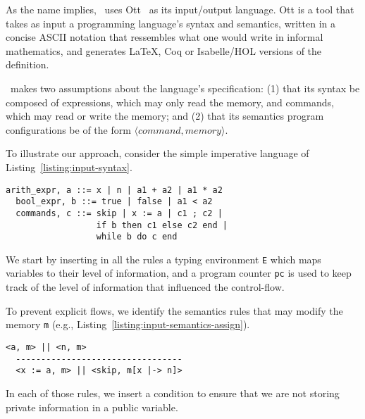 \documentclass[sigplan,10pt]{acmart}\settopmatter{printfolios=true,printccs=false,printacmref=false}
\begin{document}
As the name implies, \ottifc\ uses Ott~\cite{DBLP:journals/jfp/SewellNOPRSS10} as its input/output language. Ott is a tool that takes as input a programming language's syntax and semantics, written in a concise ASCII notation that ressembles what one would write in informal mathematics, and generates LaTeX, Coq or Isabelle/HOL versions of the definition.

\ottifc\ makes two assumptions about the language's specification: (1) that its syntax be composed of expressions, which may only read the memory, and commands, which may read or write the memory; and (2) that its semantics program configurations be of the form $\langle command, memory\rangle$. 

To illustrate our approach, consider the simple imperative language of Listing~\ref{listing:input-syntax}.
\begin{lstlisting}[label=listing:input-syntax,captionpos=b,caption=Ott syntax of a simple imperative language]
  arith_expr, a ::= x | n | a1 + a2 | a1 * a2 
  bool_expr, b ::= true | false | a1 < a2
  commands, c ::= skip | x := a | c1 ; c2 | 
                  if b then c1 else c2 end | 
                  while b do c end   
\end{lstlisting}


We start by inserting in all the rules a typing environment \lstinline{E} which maps variables to their level of information, and a program counter \lstinline{pc} is used to keep track of the level of information that influenced the control-flow.

\newpage
To prevent explicit flows, we identify the semantics rules that may modify the memory \lstinline{m} (e.g., Listing~\ref{listing:input-semantics-assign}). 

\begin{lstlisting}[label=listing:input-semantics-assign,captionpos=b,caption={Ott big-step semantics of the assign command}]
  <a, m> || <n, m>
  ---------------------------------
  <x := a, m> || <skip, m[x |-> n]>
\end{lstlisting}
In each of those rules, we insert a condition to ensure that we are not storing private information in a public variable.

\end{document}
